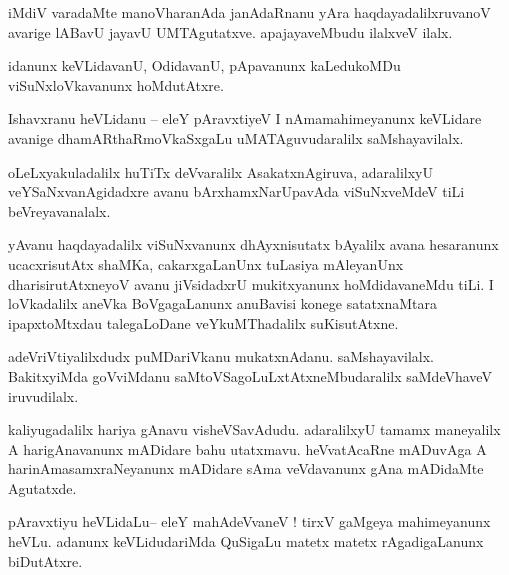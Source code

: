 \documentclass{article}
\begin{document}
\begin{mn}%
iMdiV varadaMte manoVharanAda janAdaRnanu yAra haqdayadalilxruvanoV avarige lABavU jayavU 
UMTAgutatxve. apajayaveMbudu ilalxveV ilalx.
\end{mn}

\begin{mn}%
idanunx keVLidavanU, OdidavanU, pApavanunx kaLedukoMDu viSuNxloVkavanunx hoMdutAtxre.
\end{mn}

\begin{mn}%
Ishavxranu heVLidanu -- eleY pAravxtiyeV I nAmamahimeyanunx keVLidare avanige dhamARthaRmoVkaSxgaLu 
uMATAguvudaralilx saMshayavilalx.
\end{mn}

\begin{mn}%
oLeLxyakuladalilx huTiTx deVvaralilx AsakatxnAgiruva, adaralilxyU veYSaNxvanAgidadxre avanu 
bArxhamxNarUpavAda viSuNxveMdeV tiLi beVreyavanalalx.
\end{mn}

\begin{mn}%
yAvanu haqdayadalilx viSuNxvanunx dhAyxnisutatx bAyalilx avana hesaranunx ucacxrisutAtx shaMKa, 
cakarxgaLanUnx tuLasiya mAleyanUnx dharisirutAtxneyoV avanu jiVsidadxrU mukitxyanunx 
hoMdidavaneMdu tiLi. I loVkadalilx aneVka BoVgagaLanunx anuBavisi konege satatxnaMtara 
ipapxtoMtxdau talegaLoDane veYkuMThadalilx suKisutAtxne. 
\end{mn}

\begin{mn}%
adeVriVtiyalilxdudx puMDariVkanu mukatxnAdanu. saMshayavilalx. BakitxyiMda goVviMdanu 
saMtoVSagoLuLxtAtxneMbudaralilx saMdeVhaveV iruvudilalx.
\end{mn}

\begin{mn}%
kaliyugadalilx hariya gAnavu visheVSavAdudu. adaralilxyU tamamx maneyalilx A harigAnavanunx 
mADidare bahu utatxmavu. heVvatAcaRne mADuvAga A harinAmasamxraNeyanunx mADidare sAma veVdavanunx 
gAna mADidaMte Agutatxde.
\end{mn}


\begin{mn}%
pAravxtiyu heVLidaLu-- eleY mahAdeVvaneV ! tirxV gaMgeya mahimeyanunx heVLu. adanunx keVLidudariMda 
QuSigaLu matetx matetx rAgadigaLanunx biDutAtxre.
\end{mn}
\end{document}
